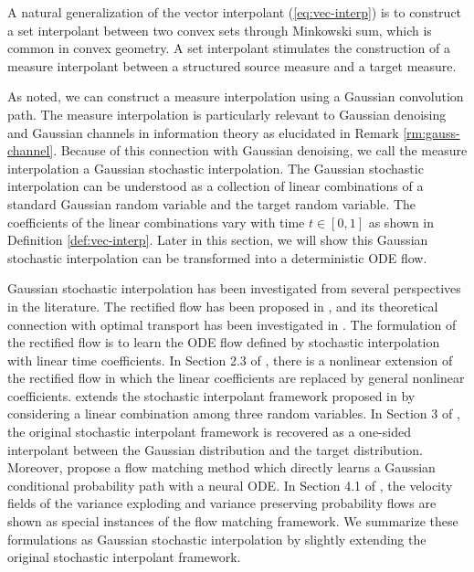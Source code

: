 \documentclass[twoside,11pt]{article}
\def\paref#1{(\ref{#1})}
\numberwithin{equation}{section}
\begin{document}
{\color{black}
    A natural generalization of the vector interpolant \paref{eq:vec-interp} is to construct a set interpolant between two convex sets through Minkowski sum, which is common in convex geometry. A set interpolant stimulates the construction of a measure interpolant between a structured source measure and a target measure.

As noted, we can construct a measure interpolation using a Gaussian convolution path.
The measure interpolation is particularly relevant to Gaussian denoising and Gaussian channels in information theory as elucidated in Remark \ref{rm:gauss-channel}. %
Because of this connection with Gaussian denoising,
we call the measure interpolation a Gaussian stochastic interpolation.
The Gaussian stochastic interpolation can be understood as a collection of linear combinations of a standard Gaussian random variable and the target random variable.
The coefficients of the linear combinations vary with time $t \in [0, 1]$ as shown in Definition \ref{def:vec-interp}.
Later in this section, we will show this Gaussian stochastic interpolation can be transformed into a deterministic ODE flow.


Gaussian stochastic interpolation has been investigated from several perspectives in the literature.
The rectified flow has been proposed in \citet{liu2023flow}, and its theoretical connection with optimal transport has been investigated in \citet{liu2022rectified}.
The formulation of the rectified flow is to learn the ODE flow defined by stochastic interpolation with linear time coefficients.
In Section 2.3 of \citet{liu2023flow}, there is a nonlinear extension of the rectified flow in which the linear coefficients are replaced by general nonlinear coefficients.
\citet{albergo2023stochastic} extends the stochastic interpolant framework proposed in \citep{albergo2023building} by considering a linear combination among three random variables.
In Section 3 of \citet{albergo2023stochastic}, the original stochastic interpolant framework is recovered as a one-sided interpolant between the Gaussian distribution and the target distribution.
Moreover, \citet{lipman2023flow} propose a flow matching method which directly learns a Gaussian conditional probability path with a neural ODE.
In Section 4.1 of \citep{lipman2023flow}, the velocity fields of the variance exploding and  variance preserving probability flows are shown as special instances of the flow matching framework.
We summarize these formulations as Gaussian stochastic interpolation by slightly extending the original stochastic interpolant framework.
}
\end{document}
